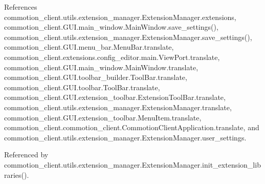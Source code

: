 References commotion\-\_\-client.\-utils.\-extension\-\_\-manager.\-Extension\-Manager.\-extensions, commotion\-\_\-client.\-G\-U\-I.\-main\-\_\-window.\-Main\-Window.\-save\-\_\-settings(), commotion\-\_\-client.\-utils.\-extension\-\_\-manager.\-Extension\-Manager.\-save\-\_\-settings(), commotion\-\_\-client.\-G\-U\-I.\-menu\-\_\-bar.\-Menu\-Bar.\-translate, commotion\-\_\-client.\-extensions.\-config\-\_\-editor.\-main.\-View\-Port.\-translate, commotion\-\_\-client.\-G\-U\-I.\-main\-\_\-window.\-Main\-Window.\-translate, commotion\-\_\-client.\-G\-U\-I.\-toolbar\-\_\-builder.\-Tool\-Bar.\-translate, commotion\-\_\-client.\-G\-U\-I.\-toolbar.\-Tool\-Bar.\-translate, commotion\-\_\-client.\-G\-U\-I.\-extension\-\_\-toolbar.\-Extension\-Tool\-Bar.\-translate, commotion\-\_\-client.\-utils.\-extension\-\_\-manager.\-Extension\-Manager.\-translate, commotion\-\_\-client.\-G\-U\-I.\-extension\-\_\-toolbar.\-Menu\-Item.\-translate, commotion\-\_\-client.\-commotion\-\_\-client.\-Commotion\-Client\-Application.\-translate, and commotion\-\_\-client.\-utils.\-extension\-\_\-manager.\-Extension\-Manager.\-user\-\_\-settings.



Referenced by commotion\-\_\-client.\-utils.\-extension\-\_\-manager.\-Extension\-Manager.\-init\-\_\-extension\-\_\-libraries().


